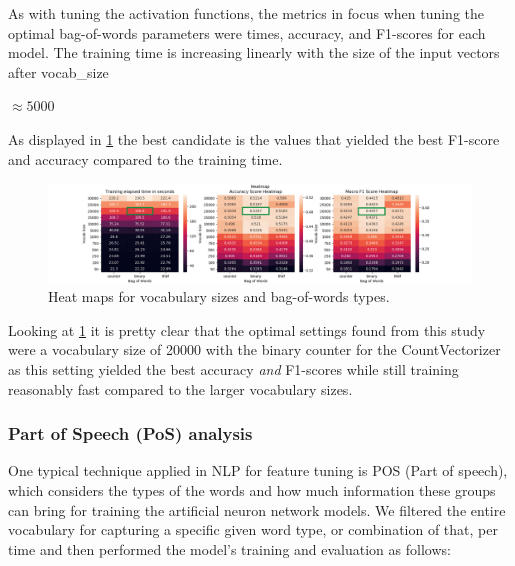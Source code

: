 As with tuning the activation functions, the metrics in focus when tuning the optimal bag-of-words parameters were times, accuracy, and F1-scores for each model. The training time is increasing linearly with the size of the input vectors after vocab\_size

$\approx 5000$

As displayed in \ref{fig:bow_heatmap} the best candidate is the values that yielded the best F1-score and accuracy compared to the training time. 

\begin{figure}[H]
\centering
\includegraphics[width=1\linewidth]{pictures/bow_heatmap.png}
\caption{Heat maps for vocabulary sizes and bag-of-words types.}
\label{fig:bow_heatmap}
\end{figure}

Looking at \ref{fig:bow_heatmap} it is pretty clear that the optimal settings found from this study were a vocabulary size of 20000 with the binary counter for the CountVectorizer as this setting yielded the best accuracy \textit{and} F1-scores while still training reasonably fast compared to the larger vocabulary sizes.

\subsubsection{Part of Speech (PoS) analysis}

\quad One typical technique applied in NLP for feature tuning is POS (Part of speech), which considers the types of the words and how much information these groups can bring for training the artificial neuron network models. We filtered the entire vocabulary for capturing a specific given word type, or combination of that, per time and then performed the model's training and evaluation as follows:

